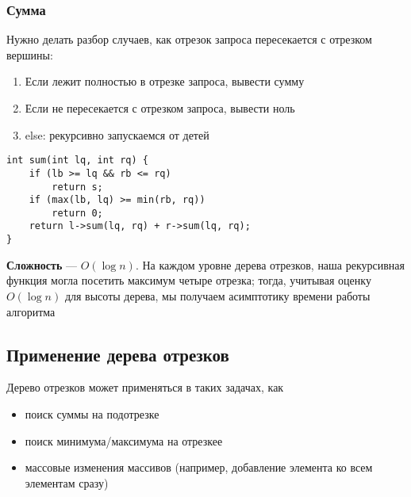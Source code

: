\documentclass[a4paper]{article}
\begin{document}
\subsubsection{Сумма}
Нужно делать разбор случаев, как отрезок запроса пересекается с отрезком вершины:
\begin{enumerate}
    \item Если лежит полностью в отрезке запроса, вывести сумму
    \item Если не пересекается с отрезком запроса, вывести ноль
    \item else: рекурсивно запускаемся от детей
\end{enumerate}
\begin{lstlisting}
int sum(int lq, int rq) {
    if (lb >= lq && rb <= rq)
        return s;
    if (max(lb, lq) >= min(rb, rq))
        return 0;
    return l->sum(lq, rq) + r->sum(lq, rq);
}
\end{lstlisting}
\indent \textbf{Сложность} — $O(\log n)$. На каждом уровне дерева отрезков, наша рекурсивная функция могла посетить максимум четыре отрезка; тогда, учитывая оценку $O (\log n)$ для высоты дерева, мы получаем асимптотику времени работы алгоритма


\subsection{Применение дерева отрезков}
Дерево отрезков может применяться в таких задачах, как
\begin{itemize}
    \item поиск суммы на подотрезке
    \item поиск минимума/максимума на отрезкее
    \item массовые изменения массивов (например, добавление элемента ко всем элементам сразу)
\end{itemize}

\newpage
\end{document}
